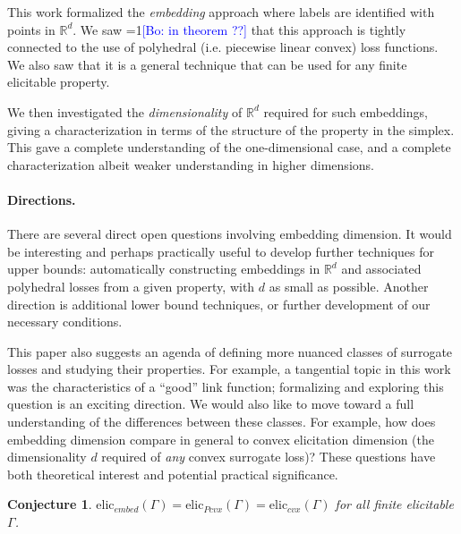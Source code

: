 \documentclass[12pt]{article}
\newcommand{\Comments}{1}
\newcommand{\mynote}[2]{\ifnum\Comments=1\textcolor{#1}{#2}\fi}
\newcommand{\bo}[1]{\mynote{blue}{[Bo: #1]}}
\newcommand{\reals}{\mathbb{R}}
\newtheorem{conjecture}{Conjecture}
\begin{document}
This work formalized the \emph{embedding} approach where labels are identified with points in $\reals^d$.
We saw \bo{in theorem ??} that this approach is tightly connected to the use of polyhedral (i.e. piecewise linear convex) loss functions.
We also saw that it is a general technique that can be used for any finite elicitable property.

We then investigated the \emph{dimensionality} of $\reals^d$ required for such embeddings, giving a characterization in terms of the structure of the property in the simplex.
This gave a complete understanding of the one-dimensional case, and a complete characterization albeit weaker understanding in higher dimensions.

\paragraph{Directions.}
There are several direct open questions involving embedding dimension.
It would be interesting and perhaps practically useful to develop further techniques for upper bounds: automatically constructing embeddings in $\reals^d$ and associated polyhedral losses from a given property, with $d$ as small as possible.
Another direction is additional lower bound techniques, or further development of our necessary conditions.

This paper also suggests an agenda of defining more nuanced classes of surrogate losses and studying their properties.
For example, a tangential topic in this work was the characteristics of a ``good'' link function; formalizing and exploring this question is an exciting direction.
We would also like to move toward a full understanding of the differences between these classes.
For example, how does embedding dimension compare in general to convex elicitation dimension (the dimensionality $d$ required of \emph{any} convex surrogate loss)?
These questions have both theoretical interest and potential practical significance.

\begin{conjecture}
  $\mathrm{elic}_{embed}(\Gamma) = \mathrm{elic}_{Pcvx}(\Gamma) = \mathrm{elic}_{cvx}(\Gamma)$ for all finite elicitable $\Gamma$.
\end{conjecture}
\end{document}
